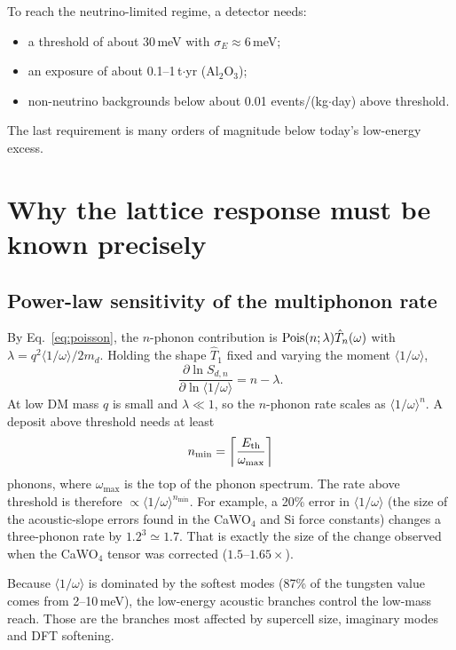 \documentclass[11pt,a4paper]{article}
\numberwithin{equation}{section}
\newcommand{\Eth}{E_{\rm th}}
\newcommand{\avg}[1]{\langle #1\rangle}
\begin{document}
To reach the neutrino-limited regime, a detector needs:
\begin{itemize}
  \item a threshold of about 30\,meV with $\sigma_E\approx6$\,meV;
  \item an exposure of about 0.1--1\,t$\cdot$yr (Al$_2$O$_3$);
  \item non-neutrino backgrounds below about 0.01 events/(kg$\cdot$day) above threshold.
\end{itemize}
The last requirement is many orders of magnitude below today's low-energy excess.

\section{Why the lattice response must be known precisely}
\label{sec:precision}
\subsection{Power-law sensitivity of the multiphonon rate}
By Eq.~\eqref{eq:poisson}, the $n$-phonon contribution is
${\rm Pois}(n;\lambda)\hat T_n(\omega)$ with $\lambda=q^2\avg{1/\omega}/2m_d$. Holding the shape
$\hat T_1$ fixed and varying the moment $\avg{1/\omega}$,
\begin{equation}
  \frac{\partial\ln S_{d,n}}{\partial\ln\avg{1/\omega}}=n-\lambda .
  \label{eq:sens}
\end{equation}
At low DM mass $q$ is small and $\lambda\ll1$, so the $n$-phonon rate scales as
$\avg{1/\omega}^n$. A deposit above threshold needs at least
\begin{equation}
  n_{\min}=\left\lceil\frac{\Eth}{\omega_{\max}}\right\rceil
\end{equation}
phonons, where $\omega_{\max}$ is the top of the phonon spectrum. The rate above threshold is
therefore $\propto\avg{1/\omega}^{n_{\min}}$. For example, a 20\% error in $\avg{1/\omega}$
(the size of the acoustic-slope errors found in the CaWO$_4$ and Si force constants) changes a
three-phonon rate by $1.2^3\simeq1.7$. That is exactly the size of the change observed when the
CaWO$_4$ tensor was corrected ($1.5$--$1.65\times$).

Because $\avg{1/\omega}$ is dominated by the softest modes (87\% of the tungsten value comes
from 2--10\,meV), the low-energy acoustic branches control the low-mass reach. Those are the
branches most affected by supercell size, imaginary modes and DFT softening.
\end{document}
